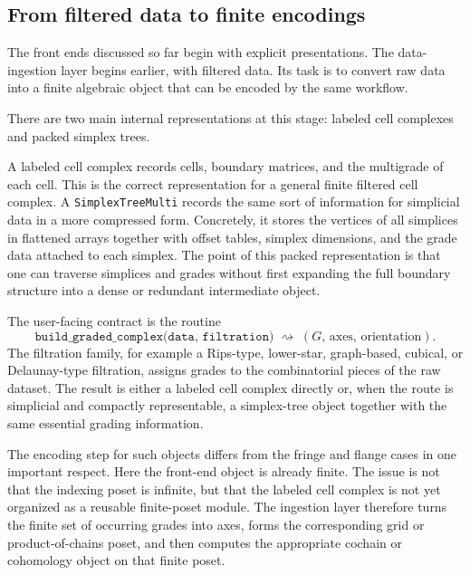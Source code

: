 \documentclass[11pt]{article}
\theoremstyle{definition}
\theoremstyle{remark}
\begin{document}
\subsection{From filtered data to finite encodings}
\label{subsec:data-to-encoding}

The front ends discussed so far begin with explicit presentations.  The data-ingestion layer begins earlier, with filtered data.  Its task is to convert raw data into a finite algebraic object that can be encoded by the same workflow.

There are two main internal representations at this stage: labeled cell complexes and packed simplex trees.

A labeled cell complex records cells, boundary matrices, and the multigrade of each cell.  This is the correct representation for a general finite filtered cell complex.  A \texttt{SimplexTreeMulti} records the same sort of information for simplicial data in a more compressed form.  Concretely, it stores the vertices of all simplices in flattened arrays together with offset tables, simplex dimensions, and the grade data attached to each simplex.  The point of this packed representation is that one can traverse simplices and grades without first expanding the full boundary structure into a dense or redundant intermediate object.

The user-facing contract is the routine
\[
\texttt{build\_graded\_complex(data, filtration)} \;\rightsquigarrow\; (G,\,\text{axes},\,\text{orientation}).
\]
The filtration family, for example a Rips-type, lower-star, graph-based, cubical, or Delaunay-type filtration, assigns grades to the combinatorial pieces of the raw dataset.  The result is either a labeled cell complex directly or, when the route is simplicial and compactly representable, a simplex-tree object together with the same essential grading information.

The encoding step for such objects differs from the fringe and flange cases in one important respect.  Here the front-end object is already finite.  The issue is not that the indexing poset is infinite, but that the labeled cell complex is not yet organized as a reusable finite-poset module.  The ingestion layer therefore turns the finite set of occurring grades into axes, forms the corresponding grid or product-of-chains poset, and then computes the appropriate cochain or cohomology object on that finite poset.
\end{document}
